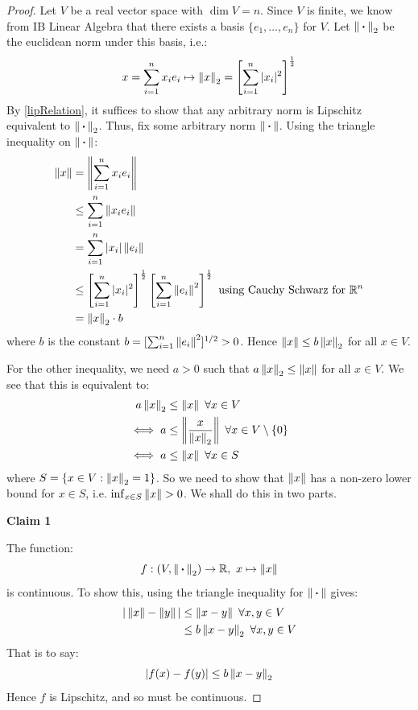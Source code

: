 \documentclass[../main.tex]{subfiles}
\begin{document}
\begin{proof}
  Let $V$ be a real vector space with $\dim V = n$.
  Since $V$ is finite, we know from IB Linear Algebra that there exists a basis $\{e_1, \ldots, e_n\}$ for $V$.
  Let $\left\lVert {\hspace{0.18em}\boldsymbol{\cdot}\hspace{0.18em}} \right\rVert_2$ be the euclidean norm under this basis, i.e.:
  \[
    x = \sum_{i = 1}^{n} x_i e_i \mapsto \left\lVert x \right\rVert_2 = \left[\sum_{i = 1}^{n} |x_i|^2\right]^{\frac{1}{2}}
  \]
  By \cref{lipRelation}, it suffices to show that any arbitrary norm is Lipschitz equivalent to $\left\lVert {\hspace{0.18em}\boldsymbol{\cdot}\hspace{0.18em}} \right\rVert_2$.
  Thus, fix some arbitrary norm $\left\lVert {\hspace{0.18em}\boldsymbol{\cdot}\hspace{0.18em}} \right\rVert$.
  Using the triangle inequality on $\left\lVert {\hspace{0.18em}\boldsymbol{\cdot}\hspace{0.18em}} \right\rVert$:
  \begin{align*}
    \left\lVert x \right\rVert &= \left\lVert \sum_{i = 1}^{n} x_i e_i \right\rVert \\
             &\leq \sum_{i = 1}^{n} \left\lVert x_i e_i \right\rVert \\
             &= \sum_{i = 1}^{n} |x_i| \left\lVert e_i \right\rVert \\
             &\leq \left[\sum_{i = 1}^{n} |x_i|^2\right]^{\frac{1}{2}} \left[\sum_{i = 1}^{n} \left\lVert e_i \right\rVert^2\right]^{\frac{1}{2}} \text{ using Cauchy Schwarz for $\mathbb{R}^{n}$} \\
             &= \left\lVert x \right\rVert_{2} \cdot b
  \end{align*}
  where $b$ is the constant $b = [\sum_{i = 1}^{n} \left\lVert e_i \right\rVert^2]^{1/2} > 0$.
  Hence $\left\lVert x \right\rVert \leq b \left\lVert x \right\rVert_2$ for all $x \in V$.

  For the other inequality, we need $a > 0$ such that $a \left\lVert x \right\rVert_2 \leq \left\lVert x \right\rVert$ for all $x \in V$.
  We see that this is equivalent to:
  \begin{align*}
    a \left\lVert x \right\rVert_2 &\leq \left\lVert x \right\rVert\ \forall x \in V \\
    \iff a &\leq \left\lVert \frac{x}{\left\lVert x \right\rVert_2} \right\rVert\ \forall x \in V \setminus \{0\} \\
    \iff a &\leq \left\lVert x \right\rVert \ \forall x \in S
  \end{align*}
  where $S = \{x \in V: \left\lVert x \right\rVert_2 = 1\}$.
  So we need to show that $\left\lVert x \right\rVert$ has a non-zero lower bound for $x \in S$, i.e. $\inf_{x \in S} \left\lVert x \right\rVert > 0$.
  We shall do this in two parts.

  \textbf{Claim 1}\par
  The function:
  \[
    f: (V, \left\lVert {\hspace{0.18em}\boldsymbol{\cdot}\hspace{0.18em}} \right\rVert_2) \to \mathbb{R},\ x \mapsto \left\lVert x \right\rVert
  \]
  is continuous.
  To show this, using the triangle inequality for $\left\lVert {\hspace{0.18em}\boldsymbol{\cdot}\hspace{0.18em}} \right\rVert$ gives:
  \begin{align*}
    |\left\lVert x \right\rVert - \left\lVert y \right\rVert| &\leq \left\lVert x - y \right\rVert\ \forall x, y \in V \\
                          &\leq b \left\lVert x - y \right\rVert_2\ \forall x, y \in V
  \end{align*}
  That is to say:
  \[
    |f(x) - f(y)| \leq b \left\lVert x - y \right\rVert_2
  \]
  Hence $f$ is Lipschitz, and so must be continuous.


\end{proof}
\end{document}
